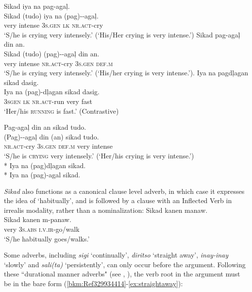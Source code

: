 \ea
\label{bkm:Ref329934231}
Sikad  iya  na  pag-agaļ. \\\smallskip \gll Sikad  (tudo)  iya  na  (pag)-{}-agaļ. \\
very  intense  \textsc{3}\textsc{s.gen}  \textsc{lk}  \textsc{nr.act}-cry \\
\glt ‘S/he is crying very intensely.’ (‘His/Her crying is very intense.’) 
\z
\ea
\label{bkm:Ref329934234}
Sikad  pag-agaļ  din  an. \\\smallskip \gll Sikad  (tudo)  (pag)-{}-agaļ  din  an. \\
very  intense  \textsc{nr.act}-cry  \textsc{3}\textsc{s.gen}  \textsc{def.m} \\
\glt ‘S/he is crying very intensely.’ (‘His/her crying is very intense.’).
\z
\ea
\label{bkm:Ref329886574}
Iya  na  pagdļagan  sikad  dasig. \\\smallskip \gll Iya  na  (pag)-dļagan  sikad  dasig. \\
\textsc{3sgen}  \textsc{lk}  \textsc{nr.act-}run  very  fast \\
\glt ‘Her/his \textsc{running} is fast.’ (Contrastive)
\z

\ea
\label{bkm:Ref429143130}
Pag-agaļ  din  an  sikad  tudo. \\\smallskip \gll (Pag)-{}-agaļ  din  (an)  sikad  tudo. \\
\textsc{nr.act}-cry  3\textsc{s.gen}  \textsc{def.m}  very  intense \\
\glt ‘S/he is \textsc{crying} very intensely.’ (‘Her/his crying is very intense.’) \\\smallskip
*{ }Iya na (pag)dļagan sikad. \\
*{ }Iya na (pag){}-agal sikad.
\z

\textit{Sikad} also functions as a canonical clause level adverb, in which case it expresses the idea of `habitually', and is followed by a clause with an Inflected Verb in irrealis modality, rather than a nominalization:  
\ea
Sikad  kanen  manaw. \\\smallskip \gll Sikad  kanen  m-panaw. \\
very  3\textsc{s.abs}  \textsc{i.v.ir}-go/walk \\
\glt ‘S/he habitually goes/walks.’ \\
\z

Some adverbs, including \textit{sigi} ‘continually’, \textit{diritso} `straight away', \textit{inay-inay} `slowly' and \textit{sali(ta)} `persistently', can only occur before the argument. Following these ``durational manner adverbs" (see , ), the verb root in the argument must be in the bare form (\ref{bkm:Ref329934414}-\ref{ex:straightaway}):

